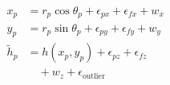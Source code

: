 \documentclass[border=7pt]{standalone}
\begin{document}
\color{ink}
$\displaystyle \begin{aligned}x_p&=r_p\cos\theta_p+\epsilon_{px}+\epsilon_{fx}+w_x\\y_p&=r_p\sin\theta_p+\epsilon_{py}+\epsilon_{fy}+w_y\\\widetilde h_p&=h(x_p,y_p)+\epsilon_{pz}+\epsilon_{fz}\\&\quad+w_z+\epsilon_{\mathrm{outlier}}\end{aligned}$
\end{document}
